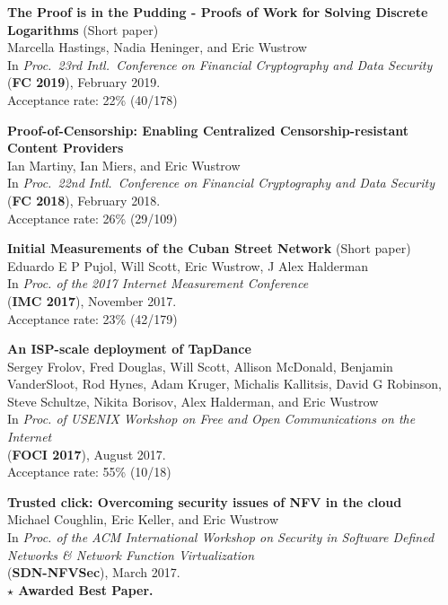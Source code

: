 \documentclass[margin,11pt]{res} %
\begin{document}
    \textbf{The Proof is in the Pudding - Proofs of Work for Solving Discrete Logarithms} (Short paper) \\
    Marcella Hastings, Nadia Heninger, and Eric Wustrow \\
    In \emph{Proc.\ 23rd Intl.\ Conference on Financial Cryptography and Data Security} \\
    (\textbf{FC 2019}), February 2019.\\
    Acceptance rate: 22\% (40/178)   %

    \textbf{Proof-of-Censorship: Enabling Centralized Censorship-resistant Content Providers} \\
    Ian Martiny, Ian Miers, and Eric Wustrow \\
    In \emph{Proc.\ 22nd Intl.\ Conference on Financial Cryptography and Data Security} \\
    (\textbf{FC 2018}), February 2018. \\
    Acceptance rate: 26\% (29/109)

    \textbf{Initial Measurements of the Cuban Street Network} (Short paper) \\
    Eduardo E P Pujol, Will Scott, Eric Wustrow, J Alex Halderman \\
    In \emph{Proc. of the 2017 Internet Measurement Conference} \\
    (\textbf{IMC 2017}), November 2017. \\
    Acceptance rate: 23\% (42/179)

    \textbf{An ISP-scale deployment of TapDance} \\
    Sergey Frolov, Fred Douglas, Will Scott, Allison McDonald, Benjamin VanderSloot, Rod Hynes, Adam Kruger, Michalis Kallitsis, David G Robinson, Steve Schultze, Nikita Borisov, Alex Halderman, and Eric Wustrow \\
    In \emph{Proc. of USENIX Workshop on Free and Open Communications on the Internet} \\
    (\textbf{FOCI 2017}), August 2017. \\
    Acceptance rate: 55\% (10/18)

    \textbf{Trusted click: Overcoming security issues of NFV in the cloud} \\
    Michael Coughlin, Eric Keller, and Eric Wustrow \\
    In \emph{Proc. of the ACM International Workshop on Security in Software Defined Networks \& Network Function Virtualization} \\
    (\textbf{SDN-NFVSec}), March 2017. \\
    \textbf{$\star$ Awarded Best Paper.}
\end{document}
